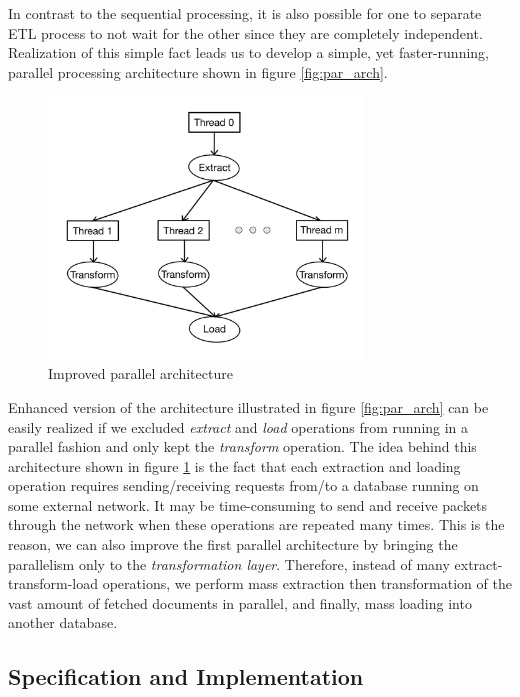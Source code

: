 In contrast to the sequential processing, it is also possible for one to separate ETL process to not 
wait for the other since they are completely independent. Realization of this simple fact leads us to 
develop a simple, yet faster-running, parallel processing architecture shown in figure 
\ref{fig:par_arch}.

\begin{figure}[H]
	\centering
	\includegraphics[width=0.75\textwidth]{../../resources/parallel_proc_arch2.jpg}
	\caption{Improved parallel architecture}
	\label{fig:par_arch2}
\end{figure}

Enhanced version of the architecture illustrated in figure \ref{fig:par_arch} can be easily realized 
if we excluded \textit{extract} and \textit{load} operations from running in a parallel fashion and 
only 
kept the \textit{transform} operation. The idea behind this architecture shown in figure 
\ref{fig:par_arch2} is the fact that each extraction and loading operation requires sending/receiving 
requests from/to a database running on some external network. It may be time-consuming to send and 
receive packets through the network when these operations are repeated many times. This is the reason, 
we can also improve the first parallel architecture by bringing the parallelism only to the 
\textit{transformation layer}. Therefore, instead of many extract-transform-load operations, we perform 
mass extraction then transformation of the vast amount of fetched documents in parallel, and finally, 
mass loading into another database.

\subsection{Specification and Implementation}

